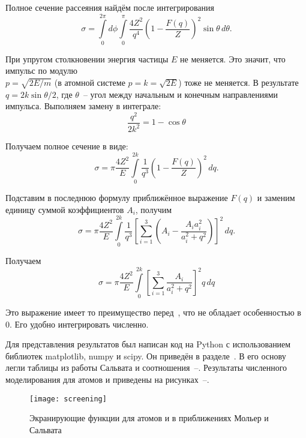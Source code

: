   Полное сечение рассеяния найдём после интегрирования
  \begin{equation}
    \sigma = \int\limits_0^{2\pi} d\phi \int\limits_0^\pi \frac{4Z^2}{q^4}
      \left( 1 - \frac{F(q)}{Z} \right)^2 \sin\theta\,d\theta.
  \end{equation}

  При упругом столкновении энергия частицы \( E \) не меняется. Это
  значит, что импульс по модулю \\ \( p = \sqrt{2E/m} \) (в атомной системе
  \( p = k = \sqrt{2E} \)) тоже не меняется. В результате
  \( q = 2 k \sin \theta / 2\), где \( \theta \)~-- угол между начальным и
  конечным направлениями импульса. Выполняем замену в интеграле:
  \[
    \frac{q^2}{2k^2} = 1-\cos \theta
  \]

  Получаем полное сечение в виде:
  \begin{equation}
    \sigma = \pi \frac{4Z^2}{E} \int\limits_0^{2k} \frac{1}{q^3}
      \left( 1 - \frac{F(q)}{Z} \right)^2\,dq.
    \label{eq:full}
  \end{equation}

  Подставим в последнюю формулу приближённое выражение \( F(q) \)
  и заменим единицу суммой коэффициентов \( A_i \), получим
  \[
    \sigma = \pi \frac{4Z^2}{E} \int\limits_0^{2k} \frac{1}{q^3}
      \left[ \sum_{i = 1}^3 \left( A_i - \frac{A_ia_i^2}{a_i^2 + q^2} \right)
      \right]^2\,dq.
  \]

  Получаем
  \begin{equation}
    \sigma = \pi \frac{4Z^2}{E} \int\limits_0^{2k}
      \left[ \sum_{i = 1}^3 \frac{A_i}{a_i^2 + q^2}  \right]^2 q\,dq
    \label{eq:sect}
  \end{equation}

  Это выражение имеет то преимущество перед~, что
  не обладает особенностью в 0. Его удобно интегрировать
  численно.

  Для представления результатов был написан код на Python с использованием
  библиотек matplotlib, numpy и scipy. Он приведён в разделе~.
  В его основу легли таблицы из работы Сальвата и
  соотношения~--. Результаты численного
  моделирования для атомов \seat и \fiat приведены на
  рисунках~--.

  \begin{figure}[h!]
    \centering
    \texttt{[image: screening]}
    \caption{Экранирующие функции для атомов \fiat и
      \seat в приближениях Мольер и Сальвата}
    \label{fig:screening}
    \end{figure}


